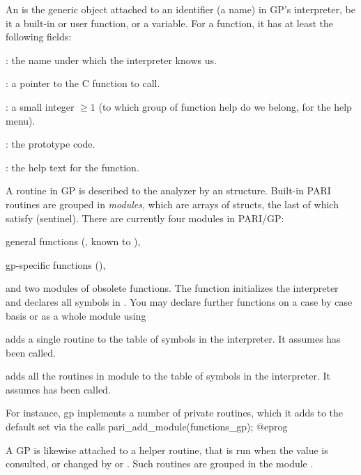 
An  is the generic object attached to an identifier (a name)
in GP's interpreter, be it a built-in or user function, or a variable. For
a function, it has at least the following fields:

  : the name under which the interpreter knows us.

  :  a pointer to the C function to call.

  : a small integer $\geq 1$ (to which group of function
                    help do we belong, for the  help menu).

  : the prototype code.

  : the help text for the function.

A routine in GP is described to the analyzer by an 
structure. Built-in PARI routines are grouped in \emph{modules}, which
are arrays of  structs, the last of which satisfy
 (sentinel). There are currently four modules in PARI/GP:

\item general functions (, known to ),

\item gp-specific functions (),

\noindent and two modules of obsolete functions. The function
 initializes the interpreter and declares all symbols in
. You may declare further functions on a case by case
basis or as a whole module using

 adds a single routine to the
table of symbols in the interpreter. It assumes  has been
called.

 adds all the routines in module
 to the table of symbols in the interpreter. It assumes
 has been called.

\noindent For instance, gp implements a number of private routines, which
it adds to the default set via the calls
\bprog
  pari_add_module(functions_gp);
@eprog

A GP  is likewise attached to a helper routine, that is run
when the value is consulted, or changed by  or .
Such routines are grouped in the module .


